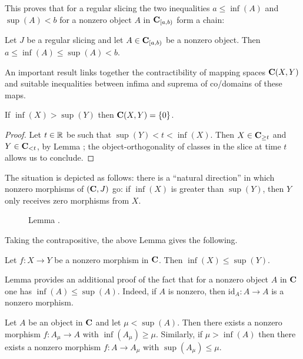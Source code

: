 This proves that for a regular slicing the two inequalities $a\le \inf(A)$ and $\sup(A) < b$ for a nonzero object $A$ in $\mathbf{C}_{[a,b)}$ form a chain:
\begin{corollary}\label{cor.estimates}
Let $J$ be a regular slicing and let $A\in \mathbf{C}_{[a,b)}$ be a nonzero object. Then $a\leq \inf(A)\leq \sup(A) < b$.
\end{corollary}
An important result links together the contractibility of mapping spaces $\mathbf{C}(X,Y)$ and suitable inequalities between infima and suprema of co\fshyp{}domains of these maps.
\begin{lemma}\label{lem.zero.morphism}
If $\inf(X)>\sup(Y)$ then $\mathbf{C}(X,Y)=\{0\}$.
\end{lemma}
\begin{proof}
Let $t\in \mathbb{R}$ be such that $\sup(Y)<t<\inf(X)$. Then $X\in \mathbf{C}_{\geq t}$ and $Y\in \mathbf{C}_{<t}$, by Lemma ; the object\hyp{}orthogonality of classes in the slice at time $t$ allows us to conclude.
\end{proof}
The situation is depicted as follows: there is a ``natural direction'' in which nonzero morphisms of $(\mathbf{C},J)$ go: if $\inf(X)$ is greater than $\sup(Y)$, then $Y$ only receives zero morphisms from $X$.
\begin{center}
\begin{figure}[H]
\caption{Lemma .}
\end{figure}
\end{center}
Taking the contrapositive, the above Lemma gives the following.
\begin{lemma}\label{lem.opposite}
Let $f\colon X\to Y$ be a nonzero morphism in $\mathbf{C}$. Then $\inf(X)\leq \sup(Y)$.
\end{lemma}
\begin{remark}
Lemma  provides an additional proof of the fact that for a nonzero object $A$ in $\mathbf{C}$ one has $\inf(A)\leq \sup(A)$. Indeed, if $A$ is nonzero, then $\mathrm{id}_A\colon A\to A$ is a nonzero morphism.
\end{remark}
\begin{lemma}\label{lem.exists.morphism}
Let $A$ be an object in $\mathbf{C}$ and let $\mu<\sup(A)$. Then there exists a nonzero morphism $f\colon A_\mu\to A$ with $\inf(A_\mu)\geq \mu$.  Similarly, if $\mu>\inf(A)$ then there exists a nonzero morphism $f\colon A\to A_\mu$ with $\sup(A_\mu)\leq \mu$.
\end{lemma}
